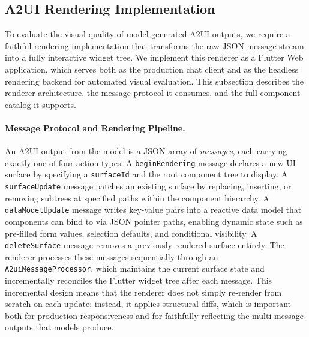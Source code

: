 \subsection{A2UI Rendering Implementation}
\label{appendix:rendering}

To evaluate the visual quality of model-generated A2UI outputs, we require a faithful rendering implementation that transforms the raw JSON message stream into a fully interactive widget tree. We implement this renderer as a Flutter Web application, which serves both as the production chat client and as the headless rendering backend for automated visual evaluation. This subsection describes the renderer architecture, the message protocol it consumes, and the full component catalog it supports.

\paragraph{Message Protocol and Rendering Pipeline.}
An A2UI output from the model is a JSON array of \emph{messages}, each carrying exactly one of four action types. A \texttt{beginRendering} message declares a new UI surface by specifying a \texttt{surfaceId} and the root component tree to display. A \texttt{surfaceUpdate} message patches an existing surface by replacing, inserting, or removing subtrees at specified paths within the component hierarchy. A \texttt{dataModelUpdate} message writes key-value pairs into a reactive data model that components can bind to via JSON pointer paths, enabling dynamic state such as pre-filled form values, selection defaults, and conditional visibility. A \texttt{deleteSurface} message removes a previously rendered surface entirely. The renderer processes these messages sequentially through an \texttt{A2uiMessageProcessor}, which maintains the current surface state and incrementally reconciles the Flutter widget tree after each message. This incremental design means that the renderer does not simply re-render from scratch on each update; instead, it applies structural diffs, which is important both for production responsiveness and for faithfully reflecting the multi-message outputs that models produce.

